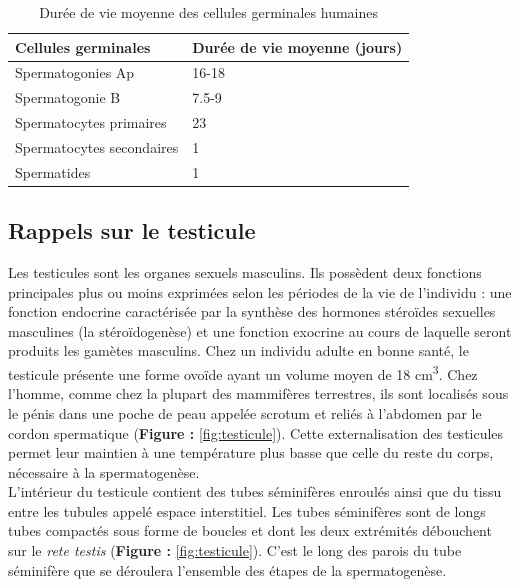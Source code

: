 \documentclass[12pt,twoside]{ugathesis}
\theoremstyle{definition}
\theoremstyle{definition}
\theoremstyle{remark}
\begin{document}
\begin{longtable}[t]{ll}
\caption{\label{tab:spermatotime}Durée de vie moyenne des cellules germinales humaines}\\
\toprule
Cellules germinales & Durée de vie moyenne (jours)\\
\midrule
Spermatogonies Ap & 16-18\\
Spermatogonie B & 7.5-9\\
Spermatocytes primaires & 23\\
Spermatocytes secondaires & 1\\
Spermatides & 1\\
\bottomrule
\end{longtable}

\newpage

\subsection{Rappels sur le testicule}\label{rappels-sur-le-testicule}

Les testicules sont les organes sexuels masculins. Ils possèdent deux
fonctions principales plus ou moins exprimées selon les périodes de la
vie de l'individu : une fonction endocrine caractérisée par la synthèse
des hormones stéroïdes sexuelles masculines (la stéroïdogenèse) et une
fonction exocrine au cours de laquelle seront produits les gamètes
masculins. Chez un individu adulte en bonne santé, le testicule présente
une forme ovoïde ayant un volume moyen de 18 cm\textsuperscript{3}. Chez
l'homme, comme chez la plupart des mammifères terrestres, ils sont
localisés sous le pénis dans une poche de peau appelée scrotum et reliés
à l'abdomen par le cordon spermatique (\textbf{Figure :}
\ref{fig:testicule}). Cette externalisation des testicules permet leur
maintien à une température plus basse que celle du reste du corps,
nécessaire à la spermatogenèse.\\
L'intérieur du testicule contient des tubes séminifères enroulés ainsi
que du tissu entre les tubules appelé espace interstitiel. Les tubes
séminifères sont de longs tubes compactés sous forme de boucles et dont
les deux extrémités débouchent sur le \emph{rete testis} (\textbf{Figure
:} \ref{fig:testicule}). C'est le long des parois du tube séminifère que
se déroulera l'ensemble des étapes de la spermatogenèse.
\end{document}
